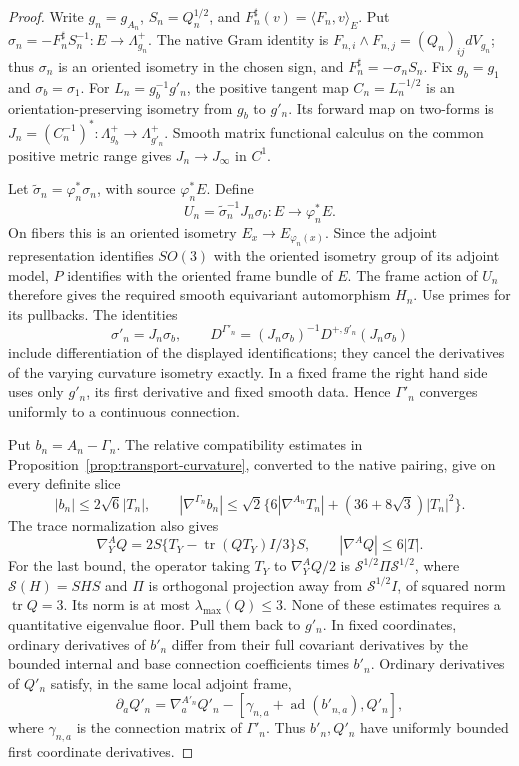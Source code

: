 \documentclass[11pt]{article}
\numberwithin{equation}{section}
\theoremstyle{definition}
\theoremstyle{remark}
\DeclareMathOperator{\tr}{tr}
\begin{document}
\begin{proof}
Write \(g_n=g_{A_n}\), \(S_n=Q_n^{1/2}\), and
\(F_n^\sharp(v)=\langle F_n,v\rangle_E\). Put
\(\sigma_n=-F_n^\sharp S_n^{-1}:E\to\Lambda^+_{g_n}\).
The native Gram identity is
\(F_{n,i}\wedge F_{n,j}=(Q_n)_{ij}dV_{g_n}\);
thus \(\sigma_n\) is an oriented isometry in the chosen
sign, and \(F_n^\sharp=-\sigma_n S_n\).
Fix \(g_b=g_1\) and \(\sigma_b=\sigma_1\).
For \(L_n=g_b^{-1}g'_n\), the positive tangent map
\(C_n=L_n^{-1/2}\) is an orientation-preserving isometry
from \(g_b\) to \(g'_n\). Its forward map on two-forms
is \(J_n=(C_n^{-1})^*:\Lambda^+_{g_b}\to\Lambda^+_{g'_n}\).
Smooth matrix functional calculus on the common positive
metric range gives \(J_n\to J_\infty\) in \(C^1\).

Let \(\widetilde\sigma_n=\varphi_n^*\sigma_n\), with
source \(\varphi_n^*E\). Define
\[
 U_n=\widetilde\sigma_n^{-1}J_n\sigma_b:E\longrightarrow
                    \varphi_n^*E.
\]
On fibers this is an oriented isometry
\(E_x\to E_{\varphi_n(x)}\). Since the adjoint
representation identifies \(SO(3)\) with the oriented
isometry group of its adjoint model, \(P\) identifies
with the oriented frame bundle of \(E\). The frame
action of \(U_n\) therefore gives the required smooth
equivariant automorphism \(H_n\).
Use primes for its pullbacks. The identities
\[
 \sigma'_n=J_n\sigma_b,\qquad
 D^{\Gamma'_n}=(J_n\sigma_b)^{-1}
                  D^{+,g'_n}(J_n\sigma_b)
\]
include differentiation of the displayed identifications;
they cancel the derivatives of the varying curvature
isometry exactly. In a fixed frame the right hand side
uses only \(g'_n\), its first derivative and fixed smooth
data. Hence \(\Gamma'_n\) converges uniformly to a
continuous connection.

Put \(b_n=A_n-\Gamma_n\). The relative compatibility
estimates in Proposition~\ref{prop:transport-curvature},
converted to the native pairing, give on every definite
slice
\[
 |b_n|\le2\sqrt6|T_n|,\qquad
 |\nabla^{\Gamma_n}b_n|
 \le\sqrt2\{6|\nabla^{A_n}T_n|
                         +(36+8\sqrt3)|T_n|^2\}.
\]
The trace normalization also gives
\[
 \nabla^A_YQ
   =2S\{T_Y-\tr(QT_Y)I/3\}S,\qquad
                         |\nabla^AQ|\le6|T|.
\]
For the last bound, the operator taking \(T_Y\) to
\(\nabla^A_YQ/2\) is
\(\mathcal S^{1/2}\Pi\mathcal S^{1/2}\), where
\(\mathcal S(H)=SHS\) and \(\Pi\) is orthogonal projection
away from \(\mathcal S^{1/2}I\), of squared norm
\(\tr Q=3\). Its norm is at most \(\lambda_{\max}(Q)\le3\).
None of these estimates requires a quantitative eigenvalue
floor. Pull them back to \(g'_n\). In fixed coordinates,
ordinary derivatives of \(b'_n\) differ from their full
covariant derivatives by the bounded internal and base
connection coefficients times \(b'_n\). Ordinary derivatives
of \(Q'_n\) satisfy, in the same local adjoint frame,
\[
 \partial_aQ'_n=\nabla^{A'_n}_aQ'_n
       -[\gamma_{n,a}+\operatorname{ad}(b'_{n,a}),Q'_n],
\]
where \(\gamma_{n,a}\) is the connection matrix of \(\Gamma'_n\).
Thus \(b'_n,Q'_n\) have uniformly bounded first coordinate derivatives.


\end{proof}
\end{document}
